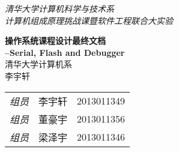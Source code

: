 \documentclass[a4paper,article,indent]{article}
\begin{document}
\begin{titlepage}
\phantom{Start!}
\vspace*{-1.7cm}

\begin{flushleft}
\emph{\Large 清华大学计算机科学与技术系}\\[0.2cm]
\emph{\Large 计算机组成原理挑战课暨软件工程联合大实验}\\[4.2cm]
\end{flushleft}
\begin{center}
{ \Huge \bfseries 操作系统课程设计最终文档}\\[0.5cm]
{ \LARGE \bfseries \qquad \qquad \qquad --Serial, Flash and Debugger}\\[0.5cm]
{ \Large  清华大学计算机系}\\[0.2cm]
{ \Large  李宇轩}\\[0.5cm]
\end{center}

\vfill

\begin{flushright}
\newcommand{\pillar}{ {\Huge \phantom{A}} }
\large
\begin{tabular}{lll}
\pillar \emph{组员} & 李宇轩 & 2013011349 \\\cline{2-3}
\pillar \emph{组员} & 董豪宇 & 2013011356 \\\cline{2-3}
\pillar \emph{组员} & 梁泽宇 & 2013011346 \\\cline{2-3}
\end{tabular}
\end{flushright}

\end{titlepage}

\renewcommand{\contentsname}{目录}
\tableofcontents
\clearpage



\clearpage
\end{document}
